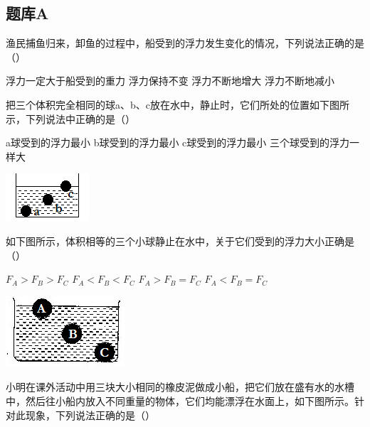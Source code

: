 \documentclass[12pt,twoside]{exam}
\begin{document}
\begin{Aquestions}
\newpage
\section{题库A}
\begin{questions}
\question
渔民捕鱼归来，卸鱼的过程中，船受到的浮力发生变化的情况，下列说法正确的是（\answerline*[D]）
\begin{choices}
\choice 浮力一定大于船受到的重力
\choice 浮力保持不变
\choice 浮力不断地增大
\choice 浮力不断地减小
\end{choices}


\question
把三个体积完全相同的球a、b、c放在水中，静止时，它们所处的位置如下图所示，下列说法中正确的是（\answerline*[C]）
\begin{multicols}{2}
\begin{choices}
\choice a球受到的浮力最小
\choice b球受到的浮力最小
\choice c球受到的浮力最小
\choice 三个球受到的浮力一样大
\end{choices}
\columnbreak
\includegraphics[scale=1]{figures/图片+14.png} 
\end{multicols}


\question
如下图所示，体积相等的三个小球静止在水中，关于它们受到的浮力大小正确是（\answerline*[D]）
\begin{multicols}{2}
\begin{choices}
\choice $F_A>F_B>F_C$
\choice $F_A<F_B<F_C$
\choice $F_A >F_B=F_C$
\choice $F_A < F_B=F_C$
\end{choices}
\columnbreak
\includegraphics[scale=1]{figures/图片+15.png} 
\end{multicols}


\question
小明在课外活动中用三块大小相同的橡皮泥做成小船，把它们放在盛有水的水槽中，然后往小船内放入不同重量的物体，它们均能漂浮在水面上，如下图所示。针对此现象，下列说法正确的是（\answerline*[C]）


\end{questions}
\end{Aquestions}
\end{document}
